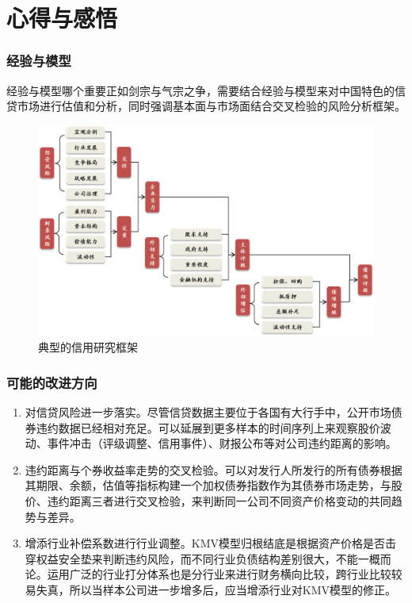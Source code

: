 \documentclass{ctexbeamer}
\begin{document}
\section{心得与感悟}

\begin{frame}
    \frametitle{经验与模型}
    经验与模型哪个重要正如剑宗与气宗之争，需要结合经验与模型来对中国特色的信贷市场进行估值和分析，同时强调基本面与市场面结合交叉检验的风险分析框架。
    \begin{figure}
        \includegraphics[width=0.8\linewidth]{fig/信用研究框架.png}
        \caption{典型的信用研究框架}
    \end{figure}
\end{frame}

\begin{frame}
    \frametitle{可能的改进方向}
    \begin{enumerate}
        \item 对信贷风险进一步落实。尽管信贷数据主要位于各国有大行手中，公开市场债券违约数据已经相对充足。可以延展到更多样本的时间序列上来观察股价波动、事件冲击（评级调整、信用事件）、财报公布等对公司违约距离的影响。
        \item 违约距离与个券收益率走势的交叉检验。可以对发行人所发行的所有债券根据其期限、余额，估值等指标构建一个加权债券指数作为其债券市场走势，与股价、违约距离三者进行交叉检验，来判断同一公司不同资产价格变动的共同趋势与差异。
        \item 增添行业补偿系数进行行业调整。KMV模型归根结底是根据资产价格是否击穿权益安全垫来判断违约风险，而不同行业负债结构差别很大，不能一概而论。运用广泛的行业打分体系也是分行业来进行财务横向比较，跨行业比较较易失真，所以当样本公司进一步增多后，应当增添行业对KMV模型的修正。
    \end{enumerate}
\end{frame}
\end{document}

